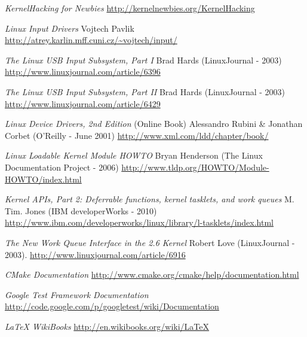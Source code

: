 
\begin{thebibliography}{99}

	\emph{KernelHacking for Newbies}
	\newline\url{http://kernelnewbies.org/KernelHacking}

	\emph{Linux Input Drivers}
	\newline Vojtech Pavlik
	\newline\url{http://atrey.karlin.mff.cuni.cz/~vojtech/input/}
	
	\emph{The Linux USB Input Subsystem, Part I}
	\newline Brad Hards (LinuxJournal - 2003) 
	\newline\url{http://www.linuxjournal.com/article/6396}

	\emph{The Linux USB Input Subsystem, Part II}
	\newline Brad Hards (LinuxJournal - 2003) 
	\newline\url{http://www.linuxjournal.com/article/6429}

	\emph{Linux Device Drivers, 2nd Edition} (Online Book)
	\newline Alessandro Rubini \& Jonathan Corbet (O'Reilly - June 2001) 
	\newline\url{http://www.xml.com/ldd/chapter/book/}

	\emph{Linux Loadable Kernel Module HOWTO}
	\newline Bryan Henderson (The Linux Documentation Project - 2006) 
	\newline\url{http://www.tldp.org/HOWTO/Module-HOWTO/index.html}

	\emph{Kernel APIs, Part 2: Deferrable functions, kernel tasklets, and work queues}
	\newline M. Tim. Jones (IBM developerWorks - 2010)
	\newline\url{http://www.ibm.com/developerworks/linux/library/l-tasklets/index.html}
	
	\emph{The New Work Queue Interface in the 2.6 Kernel}
	\newline Robert Love (LinuxJournal - 2003). 
	\newline\url{http://www.linuxjournal.com/article/6916}

	\emph{CMake Documentation}
	\newline\url{http://www.cmake.org/cmake/help/documentation.html}
	
	\emph{Google Test Framework Documentation}
	\newline\url{http://code.google.com/p/googletest/wiki/Documentation}
	
	\emph{LaTeX WikiBooks}
	\newline\url{http://en.wikibooks.org/wiki/LaTeX}
	
\end{thebibliography}
